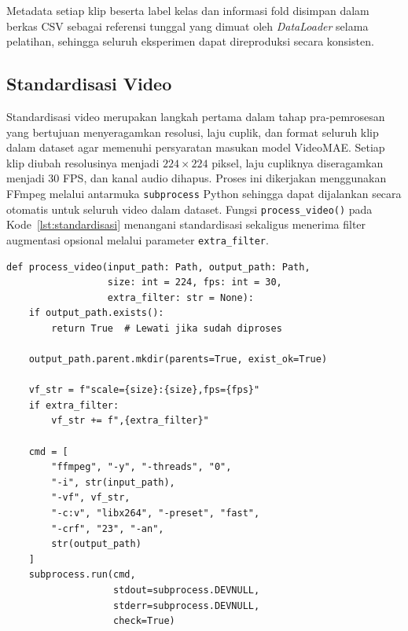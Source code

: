 Metadata setiap klip beserta label kelas dan informasi fold disimpan dalam berkas CSV sebagai referensi tunggal yang dimuat oleh \textit{DataLoader} selama pelatihan, sehingga seluruh eksperimen dapat direproduksi secara konsisten.\par

\subsection{Standardisasi Video} \label{IV.Standardisasi}

Standardisasi video merupakan langkah pertama dalam tahap pra-pemrosesan yang bertujuan menyeragamkan resolusi, laju cuplik, dan format seluruh klip dalam dataset agar memenuhi persyaratan masukan model VideoMAE. Setiap klip diubah resolusinya menjadi $224\times224$ piksel, laju cupliknya diseragamkan menjadi 30 FPS, dan kanal audio dihapus. Proses ini dikerjakan menggunakan FFmpeg melalui antarmuka \texttt{subprocess} Python sehingga dapat dijalankan secara otomatis untuk seluruh video dalam dataset. Fungsi \texttt{process\_video()} pada Kode~\ref{lst:standardisasi} menangani standardisasi sekaligus menerima filter augmentasi opsional melalui parameter \texttt{extra\_filter}.\par

\begin{lstlisting}[caption={Kode standardisasi video menggunakan FFmpeg}, label={lst:standardisasi}]
def process_video(input_path: Path, output_path: Path,
                  size: int = 224, fps: int = 30,
                  extra_filter: str = None):
    if output_path.exists():
        return True  # Lewati jika sudah diproses

    output_path.parent.mkdir(parents=True, exist_ok=True)

    vf_str = f"scale={size}:{size},fps={fps}"
    if extra_filter:
        vf_str += f",{extra_filter}"

    cmd = [
        "ffmpeg", "-y", "-threads", "0",
        "-i", str(input_path),
        "-vf", vf_str,
        "-c:v", "libx264", "-preset", "fast",
        "-crf", "23", "-an",
        str(output_path)
    ]
    subprocess.run(cmd,
                   stdout=subprocess.DEVNULL,
                   stderr=subprocess.DEVNULL,
                   check=True)
\end{lstlisting}

